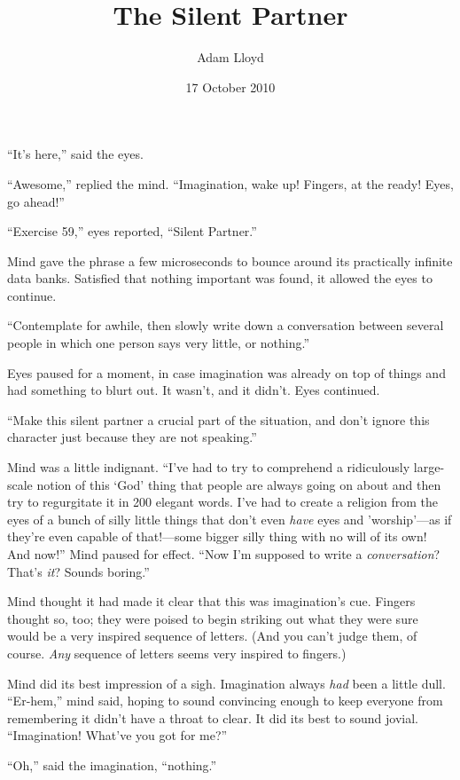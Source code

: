 \documentclass[10pt]{article}
\author{Adam Lloyd}
\title{The Silent Partner}
\date{17 October 2010}
\begin{document}
\maketitle

``It's here,'' said the eyes.

``Awesome,'' replied the mind.  ``Imagination, wake up!  Fingers, at
the ready!  Eyes, go ahead!''

``Exercise 59,'' eyes reported, ``Silent Partner.''

Mind gave the phrase a few microseconds to bounce around its practically
infinite data banks.  Satisfied that nothing important was found, it
allowed the eyes to continue.

``Contemplate for awhile, then slowly write down a conversation between
several people in which one person says very little, or nothing.''

Eyes paused for a moment, in case imagination was already on top of
things and had something to blurt out.  It wasn't, and it didn't.  Eyes
continued.

``Make this silent partner a crucial part of the situation, and don't
ignore this character just because they are not speaking.''

Mind was a little indignant.  ``I've had to try to comprehend a
ridiculously large-scale notion of this `God' thing that people are
always going on about and then try to regurgitate it in 200 elegant
words.  I've had to create a religion from the eyes of a bunch of silly
little things that don't even \emph{have} eyes and 'worship'---as if
they're even capable of that!---some bigger silly thing with no will of
its own! And now!''  Mind paused for effect.  ``Now I'm supposed to
write a \emph{conversation}?  That's \emph{it}?  Sounds boring.''

Mind thought it had made it clear that this was imagination's cue.
Fingers thought so, too; they were poised to begin striking out what
they were sure would be a very inspired sequence of letters.  (And you
can't judge them, of course.  \emph{Any} sequence of letters seems very
inspired to fingers.)

Mind did its best impression of a sigh.  Imagination always \emph{had}
been a little dull.  ``Er-hem,'' mind said, hoping to sound convincing
enough to keep everyone from remembering it didn't have a throat to
clear.  It did its best to sound jovial.  ``Imagination!  What've you
got for me?''

``Oh,'' said the imagination, ``nothing.''
\end{document}
